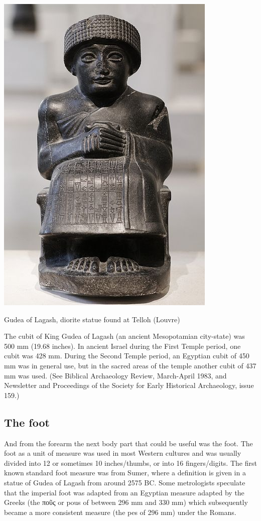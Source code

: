 \documentclass{tufte-book}
\begin{document}
\begin{marginfigure}
\includegraphics[width=\linewidth]{./graphics/gudea}
\caption{Gudea of Lagash, diorite statue found at Telloh (Louvre)}
\end{marginfigure}
The cubit of King Gudea of Lagash (an ancient Mesopotamian city-state) was 500 mm (19.68 inches). In ancient Israel during the First Temple period, one cubit was 428 mm. During the Second Temple period, an Egyptian cubit of 450 mm was in general use, but in the sacred areas of the temple another cubit of 437 mm was used. (See Biblical Archaeology Review, March-April 1983, and Newsletter and Proceedings of the Society for Early Historical Archaeology, issue 159.)

\subsection{The foot}
And from the forearm the next body part that could be useful was the foot. The foot as a unit of measure was used in most Western cultures and was usually divided into 12 or sometimes 10 inches/thumbs, or into 16 fingers/digits. The first known standard foot measure was from Sumer, where a definition is given in a statue of Gudea of Lagash from around 2575 BC. Some metrologists speculate that the imperial foot was adapted from an Egyptian measure adapted by the Greeks (the ποῦς or pous of between 296 mm and 330 mm) which subsequently became a more consistent measure (the pes of 296 mm) under the Romans.
\end{document}

